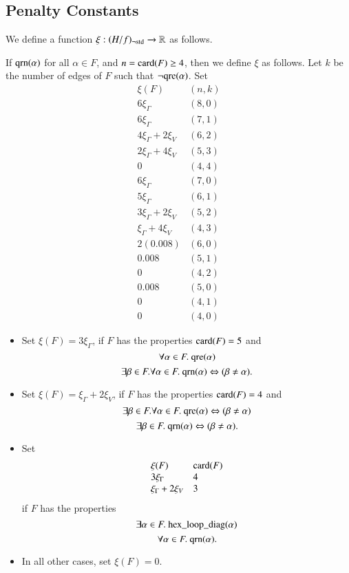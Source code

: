 \subsection{Penalty Constants}
\label{sec:pc}


We define a function $\xi:(H/f)_{\neg{\operatorname{std}}}\to\mathbb{R}$ as
follows.

If ${\operatorname{qrn}}(\alpha)$ for all $\alpha\in F$, and $n={\operatorname{card}}(F)\ge
4$, then we define $\xi$ as follows.  Let $k$ be the number of
edges of $F$ such that $\neg{\operatorname{qre}}(\alpha)$.  Set
    $$
    \begin{array}{lll}
    \xi(F) & (n,k)\\
    6 \xi_\Gamma & (8,0)\\
    6 \xi_\Gamma & (7,1)\\
    4 \xi_\Gamma + 2 \xi_V & (6,2)\\
    2 \xi_\Gamma + 4 \xi_V & (5,3)\\
    0 & (4,4)\\
    6 \xi_\Gamma & (7,0)\\
    5 \xi_\Gamma & (6,1)\\
    3\xi_\Gamma + 2 \xi_V & (5,2)\\
    \xi_\Gamma + 4\xi_V & (4,3)\\
    2(0.008) & (6,0) \\
    0.008 & (5,1) \\
    0 & (4,2) \\
    0.008 & (5,0) \\
    0 & (4,1) \\
    0 & (4,0)
    \end{array}
    $$
%
\begin{itemize}
\item Set
    $\xi(F) = 3\xi_\Gamma$, if $F$ has the properties ${\operatorname{card}}(F)=5$
    and
    $$\forall\alpha\in F.\
    {\operatorname{qre}}(\alpha)$$
    $$
    \exists\beta\in F.\forall\alpha\in F.\
    {\operatorname{qrn}}(\alpha)\Leftrightarrow
(\beta\ne\alpha).$$
%
%
\item Set $\xi(F) = \xi_\Gamma + 2\xi_V$, if $F$ has the
properties
    ${\operatorname{card}}(F)=4$ and
    $$\exists\beta\in F.\forall\alpha\in F.\
    {\operatorname{qre}}(\alpha)\Leftrightarrow (\beta\ne\alpha)
    $$
    $$\exists\beta\in F.\ \op{qrn}(\alpha)\Leftrightarrow
    (\beta\ne\alpha).$$
\item Set
    $$
    \begin{array}{lll}
    \xi(F) & {\operatorname{card}}(F)\\
    3 \xi_\Gamma & 4\\
     \xi_\Gamma + 2\xi_V & 3\\
    \end{array}
    $$
if $F$ has the properties
    $$
    \exists\alpha\in F.\ \op{hex\_loop\_diag}(\alpha)
    $$
    $$
    \forall\alpha\in F.\ \op{qrn}(\alpha).
    $$
\item In all other cases, set $\xi(F)=0$.
\end{itemize}


